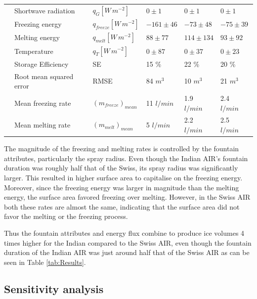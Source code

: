 \documentclass[utf8]{frontiersSCNS} %
\begin{document}
\begin{table}
\begin{tabular}{@{}|llllll|@{}}
		\multicolumn{1}{|l|}{} & Shortwave radiation     & $q_{G} [W\,m^{-2}]  $     & $0 \pm 1$     & $0 \pm 1$     & $0 \pm 1$     \\
		\multicolumn{1}{|l|}{} & Freezing energy         & $q_{freeze} [W\,m^{-2}] $ & $-161\pm 46$  & $-73 \pm 48$  & $-75\pm 39$   \\
		\multicolumn{1}{|l|}{} & Melting energy          & $q_{melt} [W\,m^{-2}] $   & $88 \pm 77$   & $114\pm 134$  & $93 \pm 92$   \\
		\multicolumn{1}{|l|}{} & Temperature             & $q_{T} [W\,m^{-2}] $      & $0 \pm 87$    & $0 \pm 37$    & $0 \pm 23$    \\\midrule
		\multicolumn{1}{|l|}{\multirow{3}{*}{\rotatebox[origin=c]{90}{Charecteristics}}}
		                       & Storage Efficiency      & SE                        & 15 \%         & 22 \%         & 20 \%         \\
		\multicolumn{1}{|l|}{} & Root mean squared error & RMSE                      & 84 $m^{3}$    & 10 $m^{3}$    & 21 $m^{3}$    \\
		\multicolumn{1}{|l|}{} & Mean freezing rate      & $(m_{freeze})_{mean}$     & 11 $l/min$    & 1.9 $l/min$   & 2.4 $l/min$   \\
		\multicolumn{1}{|l|}{} & Mean melting rate       & $(m_{melt})_{mean}$       & 5 $l/min$     & 2.2 $l/min$   & 2.5 $l/min$   \\\bottomrule
	\end{tabular}
\end{table}

The magnitude of the freezing and melting rates is controlled by the fountain attributes, particularly the spray radius.
Even though the Indian AIR's fountain duration was roughly half that of the Swiss, its spray radius was significantly
larger. This resulted in higher surface area to capitalise on the freezing energy. Moreover, since the freezing energy
was larger in magnitude than the melting energy, the surface area favored freezing over melting. However, in the Swiss
AIR both these rates are almost the same, indicating that the surface area did not favor the melting or the freezing process.

Thus the fountain attributes and energy flux combine to produce ice volumes 4 times higher for the Indian compared to the Swiss AIR, even though the fountain duration of the Indian AIR was just around half that of the Swiss AIR as can be seen in Table \ref{tab:Results}.

\subsection{Sensitivity analysis}
\end{document}
